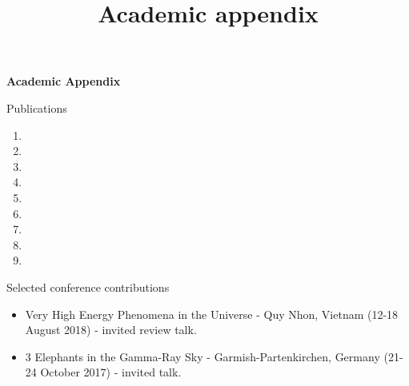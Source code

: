\documentclass{resume} %
\begin{document}





\newpage


\title{{Academic appendix}}
\hfil{\Large{\bf Academic Appendix}}\hfil\\
\nameskip\break
{}

\begin{rSection}{Publications}
  \begin{enumerate}
    \item {}
    \item {}
    \item {}
    \item {}
    \item {}
    \item {}
    \item {}
    \item {}
    \item {}
  \end{enumerate}
\end{rSection}
\begin{rSection}{Selected conference contributions}
  \begin{itemize}
    \item Very High Energy Phenomena in the Universe - Quy Nhon, Vietnam (12-18 August 2018) - invited review talk.
    \item 3 Elephants in the Gamma-Ray Sky - Garmish-Partenkirchen, Germany (21-24 October 2017) - invited talk.
  \end{itemize}

\end{rSection}

\end{document}
